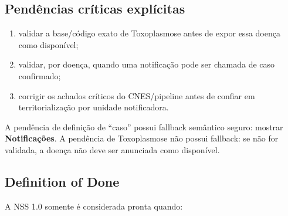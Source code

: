 \subsection{Pendências críticas explícitas}

\begin{enumerate}
    \item validar a base/código exato de Toxoplasmose antes de expor essa doença como disponível;
    \item validar, por doença, quando uma notificação pode ser chamada de caso confirmado;
    \item corrigir os achados críticos do CNES/pipeline antes de confiar em territorialização por unidade notificadora.
\end{enumerate}

A pendência de definição de ``caso'' possui fallback semântico seguro: mostrar \textbf{Notificações}. A pendência de Toxoplasmose não possui fallback: se não for validada, a doença não deve ser anunciada como disponível.

\subsection{Definition of Done}

A NSS 1.0 somente é considerada pronta quando:


